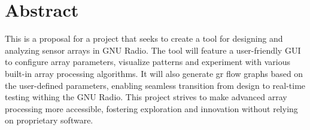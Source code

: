 \chapter*{Abstract}

This is a proposal for a project that seeks to create a tool for designing and analyzing sensor arrays in GNU Radio. The tool will feature a user-friendly GUI to configure array parameters, visualize patterns and experiment with various built-in array processing algorithms. It will also generate \acf{gr} flow graphs based on the user-defined parameters, enabling seamless transition from design to real-time testing withing the GNU Radio. This project strives to make advanced array processing more accessible, fostering exploration and innovation without relying on proprietary software.
